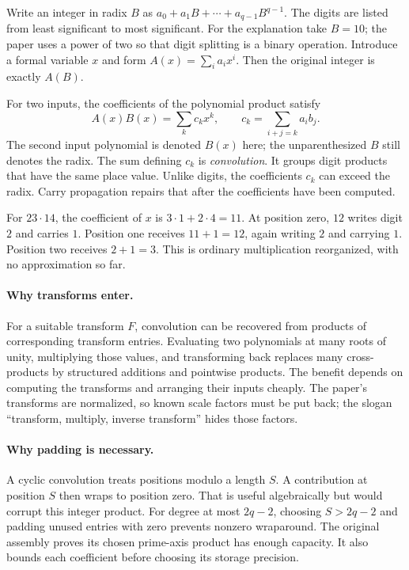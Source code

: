 
Write an integer in radix $B$ as $a_0+a_1B+\cdots+a_{q-1}B^{q-1}$.
The digits are listed from least significant to most significant. For the
explanation take $B=10$; the paper uses a power of two so that digit splitting
is a binary operation. Introduce a formal variable $x$ and form
$A(x)=\sum_i a_i x^i$. Then the original integer is exactly $A(B)$.

For two inputs, the coefficients of the polynomial product satisfy
\[
 A(x)B(x)=\sum_k c_k x^k,\qquad c_k=\sum_{i+j=k}a_i b_j.
\]
The second input polynomial is denoted $B(x)$ here; the unparenthesized $B$
still denotes the radix. The sum defining $c_k$ is \emph{convolution}.
It groups digit products that have the same place value. Unlike digits,
the coefficients $c_k$ can exceed the radix. Carry propagation repairs that
after the coefficients have been computed.


For $23\cdot14$, the coefficient of $x$ is $3\cdot1+2\cdot4=11$.
At position zero, $12$ writes digit $2$ and carries $1$. Position one
receives $11+1=12$, again writing $2$ and carrying $1$. Position two
receives $2+1=3$. This is ordinary multiplication reorganized, with no
approximation so far.

\paragraph{Why transforms enter.}
For a suitable transform $F$, convolution can be recovered from products of
corresponding transform entries. Evaluating two polynomials at many roots of
unity, multiplying those values, and transforming back replaces many
cross-products by structured additions and pointwise products. The benefit
depends on computing the transforms and arranging their inputs cheaply.
The paper's transforms are normalized, so known scale factors must be put back;
the slogan ``transform, multiply, inverse transform'' hides those factors.

\paragraph{Why padding is necessary.}
A cyclic convolution treats positions modulo a length $S$. A contribution at
position $S$ then wraps to position zero. That is useful algebraically but
would corrupt this integer product. For degree at most $2q-2$, choosing
$S>2q-2$ and padding unused entries with zero prevents nonzero wraparound.
The original assembly proves its chosen prime-axis product has enough capacity.
It also bounds each coefficient before choosing its storage precision.

